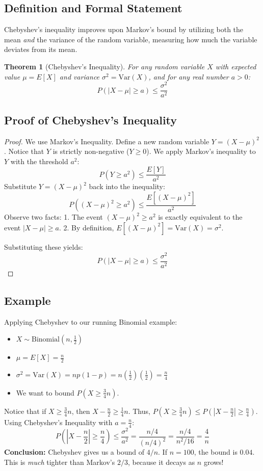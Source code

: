 \documentclass{article}
\newtheorem{theorem}{Theorem}
\begin{document}
\subsection{Definition and Formal Statement}
Chebyshev's inequality improves upon Markov's bound by utilizing both the mean \textit{and} the variance of the random variable, measuring how much the variable deviates from its mean.

\begin{theorem}[Chebyshev's Inequality]
For any random variable $X$ with expected value $\mu = E[X]$ and variance $\sigma^2 = \text{Var}(X)$, and for any real number $a > 0$:
\[ P(|X - \mu| \ge a) \le \frac{\sigma^2}{a^2} \]
\end{theorem}

\subsection{Proof of Chebyshev's Inequality}
\begin{proof}
We use Markov's Inequality. Define a new random variable $Y = (X - \mu)^2$.
Notice that $Y$ is strictly non-negative ($Y \ge 0$).
We apply Markov's inequality to $Y$ with the threshold $a^2$:
\[ P(Y \ge a^2) \le \frac{E[Y]}{a^2} \]
Substitute $Y = (X - \mu)^2$ back into the inequality:
\[ P((X - \mu)^2 \ge a^2) \le \frac{E[(X - \mu)^2]}{a^2} \]
Observe two facts:
1. The event $(X - \mu)^2 \ge a^2$ is exactly equivalent to the event $|X - \mu| \ge a$.
2. By definition, $E[(X - \mu)^2] = \text{Var}(X) = \sigma^2$.

Substituting these yields:
\[ P(|X - \mu| \ge a) \le \frac{\sigma^2}{a^2} \]
\end{proof}

\subsection{Example}
Applying Chebyshev to our running Binomial example:
\begin{itemize}
    \item $X \sim \text{Binomial}(n, \frac{1}{2})$
    \item $\mu = E[X] = \frac{n}{2}$
    \item $\sigma^2 = \text{Var}(X) = n p (1-p) = n(\frac{1}{2})(\frac{1}{2}) = \frac{n}{4}$
    \item We want to bound $P(X \ge \frac{3}{4}n)$.
\end{itemize}
Notice that if $X \ge \frac{3}{4}n$, then $X - \frac{n}{2} \ge \frac{1}{4}n$.
Thus, $P(X \ge \frac{3}{4}n) \le P(|X - \frac{n}{2}| \ge \frac{n}{4})$.
Using Chebyshev's Inequality with $a = \frac{n}{4}$:
\[ P\left(\left|X - \frac{n}{2}\right| \ge \frac{n}{4}\right) \le \frac{\sigma^2}{a^2} = \frac{n/4}{(n/4)^2} = \frac{n/4}{n^2/16} = \frac{4}{n} \]
\textbf{Conclusion:} Chebyshev gives us a bound of $4/n$. If $n=100$, the bound is $0.04$. This is \textit{much} tighter than Markov's $2/3$, because it decays as $n$ grows!
\end{document}
